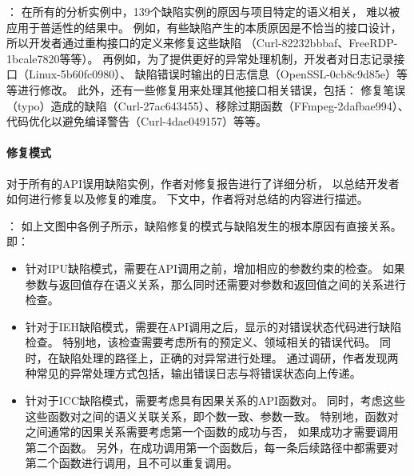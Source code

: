 
\vspace*{10pt}
\begin{center}
	\noindent{}
\end{center}

：
在所有的分析实例中，139个缺陷实例的原因与项目特定的语义相关，
难以被应用于普适性的结果中。
例如，有些缺陷产生的本质原因是不恰当的接口设计，所以开发者通过重构接口的定义来修复这些缺陷
（Curl-82232bbbaf、FreeRDP-1bcale7820等等）。
再例如，为了提供更好的异常处理机制，开发者对日志记录接口（Linux-5b60fc0980）、
缺陷错误时输出的日志信息（OpenSSL-0cb8c9d85e）等等进行修改。
此外，还有一些修复用来处理其他接口相关错误，包括：
修复笔误（typo）造成的缺陷（Curl-27ac643455）、移除过期函数（FFmpeg-2dafbae994）、
代码优化以避免编译警告（Curl-4dae049157）等等。

\paragraph{修复模式}
对于所有的API误用缺陷实例，作者对修复报告进行了详细分析，
以总结开发者如何进行修复以及修复的难度。
下文中，作者将对总结的内容进行描述。

\vspace*{10pt}
{}：
如上文图中各例子所示，缺陷修复的模式与缺陷发生的根本原因有直接关系。即：
\begin{itemize}
	\item 针对IPU缺陷模式，需要在API调用之前，增加相应的参数约束的检查。
	如果参数与返回值存在语义关系，那么同时还需要对参数和返回值之间的关系进行检查。
	\item 针对于IEH缺陷模式，需要在API调用之后，显示的对错误状态代码进行缺陷检查。
	特别地，该检查需要考虑所有的预定义、领域相关的错误代码。
	同时，在缺陷处理的路径上，正确的对异常进行处理。
	通过调研，作者发现两种常见的异常处理方式包括，输出错误日志与将错误状态向上传递。
	\item 针对于ICC缺陷模式，需要考虑具有因果关系的API函数对。
	同时，考虑这些这些函数对之间的语义关联关系，即个数一致、参数一致。
	特别地，函数对之间通常的因果关系需要考虑第一个函数的成功与否，
	如果成功才需要调用第二个函数。
	另外，在成功调用第一个函数后，每一条后续路径中都需要对第二个函数进行调用，且不可以重复调用。
\end{itemize}


